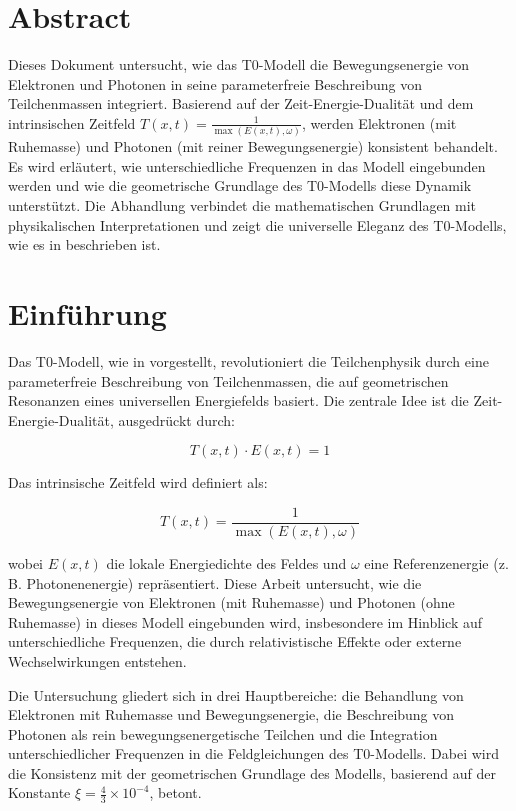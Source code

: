 \section*{Abstract}
		Dieses Dokument untersucht, wie das T0-Modell die Bewegungsenergie von Elektronen und Photonen in seine parameterfreie Beschreibung von Teilchenmassen integriert. Basierend auf der Zeit-Energie-Dualität und dem intrinsischen Zeitfeld \( T(x,t) = \frac{1}{\max(E(x,t), \omega)} \), werden Elektronen (mit Ruhemasse) und Photonen (mit reiner Bewegungsenergie) konsistent behandelt. Es wird erläutert, wie unterschiedliche Frequenzen in das Modell eingebunden werden und wie die geometrische Grundlage des T0-Modells diese Dynamik unterstützt. Die Abhandlung verbindet die mathematischen Grundlagen mit physikalischen Interpretationen und zeigt die universelle Eleganz des T0-Modells, wie es in \cite{pascher_t0_energie_2025} beschrieben ist.

	
	
	\section{Einführung}
	\label{sec:introduction}
	
	Das T0-Modell, wie in \cite{pascher_t0_energie_2025} vorgestellt, revolutioniert die Teilchenphysik durch eine parameterfreie Beschreibung von Teilchenmassen, die auf geometrischen Resonanzen eines universellen Energiefelds basiert. Die zentrale Idee ist die Zeit-Energie-Dualität, ausgedrückt durch:
	
	\begin{equation}
		T(x,t) \cdot E(x,t) = 1
		\label{eq:time_energy_duality}
	\end{equation}
	
	Das intrinsische Zeitfeld wird definiert als:
	
	\begin{equation}
		T(x,t) = \frac{1}{\max(E(x,t), \omega)}
		\label{eq:intrinsic_time_field}
	\end{equation}
	
	wobei \( E(x,t) \) die lokale Energiedichte des Feldes und \(\omega\) eine Referenzenergie (z. B. Photonenenergie) repräsentiert. Diese Arbeit untersucht, wie die Bewegungsenergie von Elektronen (mit Ruhemasse) und Photonen (ohne Ruhemasse) in dieses Modell eingebunden wird, insbesondere im Hinblick auf unterschiedliche Frequenzen, die durch relativistische Effekte oder externe Wechselwirkungen entstehen.
	
	Die Untersuchung gliedert sich in drei Hauptbereiche: die Behandlung von Elektronen mit Ruhemasse und Bewegungsenergie, die Beschreibung von Photonen als rein bewegungsenergetische Teilchen und die Integration unterschiedlicher Frequenzen in die Feldgleichungen des T0-Modells. Dabei wird die Konsistenz mit der geometrischen Grundlage des Modells, basierend auf der Konstante \(\xi = \frac{4}{3} \times 10^{-4}\), betont.
	
